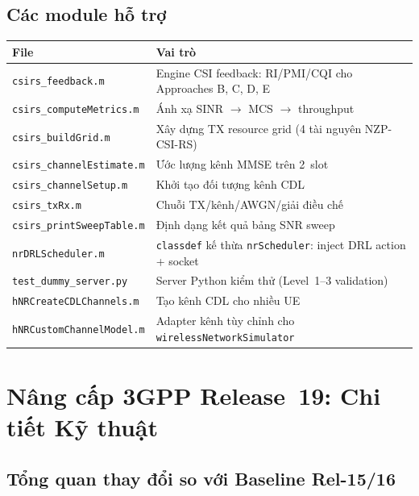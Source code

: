 \documentclass[12pt, a4paper]{article}
\newcommand{\file}[1]{\texttt{#1}}
\begin{document}
\subsection{Các module hỗ trợ}

\begin{center}
\begin{tabular}{L{5cm} L{9.5cm}}
\toprule
\textbf{File} & \textbf{Vai trò} \\
\midrule
\file{csirs\_feedback.m} &
  Engine CSI feedback: RI/PMI/CQI cho Approaches B, C, D, E \\[3pt]
\file{csirs\_computeMetrics.m} &
  Ánh xạ SINR $\to$ MCS $\to$ throughput \\[3pt]
\file{csirs\_buildGrid.m} &
  Xây dựng TX resource grid (4 tài nguyên NZP-CSI-RS) \\[3pt]
\file{csirs\_channelEstimate.m} &
  Ước lượng kênh MMSE trên 2~slot \\[3pt]
\file{csirs\_channelSetup.m} &
  Khởi tạo đối tượng kênh CDL \\[3pt]
\file{csirs\_txRx.m} &
  Chuỗi TX/kênh/AWGN/giải điều chế \\[3pt]
\file{csirs\_printSweepTable.m} &
  Định dạng kết quả bảng SNR sweep \\[3pt]
\file{nrDRLScheduler.m} &
  \texttt{classdef} kế thừa \texttt{nrScheduler}: inject DRL action + socket \\[3pt]
\file{test\_dummy\_server.py} &
  Server Python kiểm thử (Level~1--3 validation) \\[3pt]
\file{hNRCreateCDLChannels.m} &
  Tạo kênh CDL cho nhiều UE \\[3pt]
\file{hNRCustomChannelModel.m} &
  Adapter kênh tùy chỉnh cho \texttt{wirelessNetworkSimulator} \\
\bottomrule
\end{tabular}
\label{tab:modules}
\end{center}

\section{Nâng cấp 3GPP Release~19: Chi tiết Kỹ thuật}

\subsection{Tổng quan thay đổi so với Baseline Rel-15/16}
\end{document}
